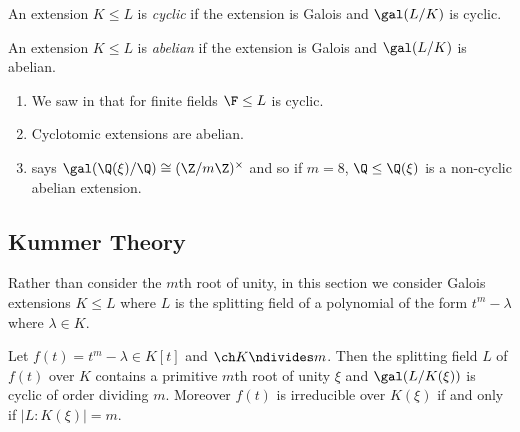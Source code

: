 \documentclass[a4paper]{article}
\begin{document}
\begin{definition}
  An extension \(K \leq L\) is \emph{cyclic} if the extension is Galois and \(\gal(L/K)\) is cyclic.
\end{definition}

\begin{definition}
  An extension \(K \leq L\) is \emph{abelian} if the extension is Galois and \(\gal(L/K)\) is abelian.
\end{definition}

\begin{eg}\leavevmode
  \begin{enumerate}
  \item We saw in  that for finite fields \(\F \leq L\) is cyclic.
  \item Cyclotomic extensions are abelian.
  \item {} says \(\gal(\Q(\xi)/\Q) \cong  (\Z/m\Z)^\times\) and so if \(m = 8\), \(\Q \leq \Q(\xi)\) is a non-cyclic abelian extension.
  \end{enumerate}
\end{eg}

\subsection{Kummer Theory}

Rather than consider the \(m\)th root of unity, in this section we consider Galois extensions \(K \leq L\) where \(L\) is the splitting field of a polynomial of the form \(t^m - \lambda\) where \(\lambda \in K\).

\begin{theorem}
  \label{thm:splitting field of tm - lambda}
  Let \(f(t) = t^m - \lambda \in K[t]\) and \(\ch K \ndivides m\). Then the splitting field \(L\) of \(f(t)\) over \(K\) contains a primitive \(m\)th root of unity \(\xi\) and \(\gal(L/K(\xi))\) is cyclic of order dividing \(m\). Moreover \(f(t)\) is irreducible over \(K(\xi)\) if and only if \(|L:K(\xi)| = m\).
\end{theorem}
\end{document}
